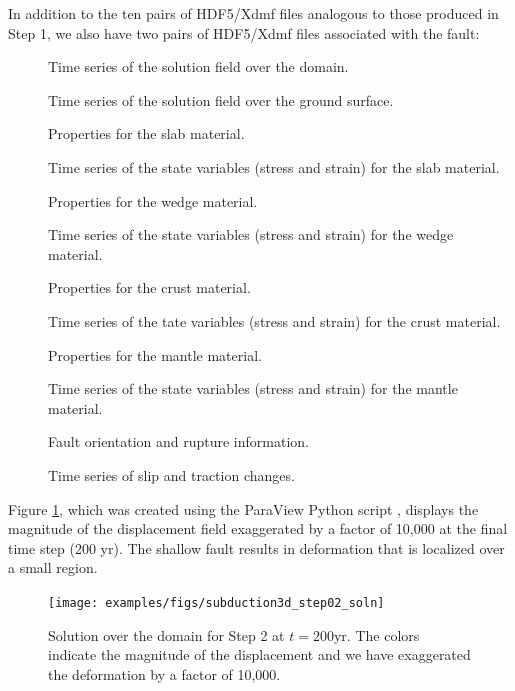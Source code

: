 In addition to the ten pairs of HDF5/Xdmf files analogous to those
produced in Step 1, we also have two pairs of HDF5/Xdmf files
associated with the fault:
\begin{description}
\item[] Time series of the solution field over the domain.
\item[] Time series of the solution field over the ground surface.
\item[] Properties for
  the slab material.
\item[] Time series of the state variables (stress and strain) for the slab material.
\item[] Properties for
  the wedge material.
\item[] Time series of the state variables (stress and strain) for the wedge material.
\item[] Properties for
  the crust material.
\item[] Time series of the tate variables
  (stress and strain) for the crust material.
\item[] Properties for
  the mantle material.
\item[] Time series of the state variables
  (stress and strain) for the mantle material.
\item[] Fault orientation
  and rupture information.
\item[] Time series of slip and
  traction changes.
\end{description}

Figure \ref{fig:example:subduction:3d:step02}, which was created
using the ParaView Python script ,
displays the magnitude of the displacement field exaggerated by a
factor of 10,000 at the final time step (200 yr).  The shallow
fault results in deformation that is localized over a small region.

\begin{figure}
  \texttt{[image: examples/figs/subduction3d\_step02\_soln]}
  \caption{Solution over the domain for Step 2 at $t = 200 \mathrm{yr}$. The
    colors indicate the magnitude of the displacement and we have
    exaggerated the deformation by a factor of 10,000.}
  \label{fig:example:subduction:3d:step02}
\end{figure}


